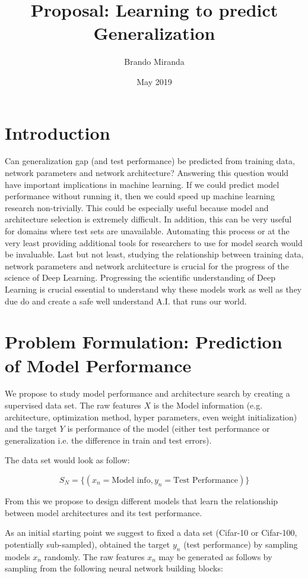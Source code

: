 \documentclass{article}
\title{Proposal: Learning to predict Generalization}
\author{Brando Miranda }
\date{May 2019}
\begin{document}
\maketitle

\section{Introduction}

Can generalization gap (and test performance) be predicted from training data, network parameters and network architecture?
Answering this question would have important implications in machine learning.
If we could predict model performance without running it, then we could speed up machine learning research non-trivially.
This could be especially useful because model and architecture selection is extremely difficult.
In addition, this can be very useful for domains where test sets are unavailable.
Automating this process or at the very least providing additional tools for researchers to use for model search would be invaluable.
Last but not least, studying the relationship between training data, network parameters and network architecture is crucial for the progress of the science of Deep Learning.
Progressing the scientific understanding of Deep Learning is crucial essential to understand why these models work as well as they due do and create a safe well understand A.I. that runs our world. 

\section{Problem Formulation: Prediction of Model Performance }

We propose to study model performance and architecture search by creating a supervised data set. 
The raw features $X$ is the Model information (e.g. architecture, optimization method, hyper parameters, even weight initialization) and the target $Y$ is performance of the model (either test performance or generalization i.e. the difference in train and test errors). 

The data set would look as follow:

$$ S_N = \{ (x_n = \text{Model info}, y_n = \text{Test Performance} ) \}$$

From this we propose to design different models that learn the relationship between model architectures and its test performance.

As an initial starting point we suggest to fixed a data set (Cifar-10 or Cifar-100, potentially sub-sampled), obtained the target $y_n$ (test performance) by sampling models $x_n$ randomly. 
The raw features $x_n$ may be generated as follows by sampling from the following neural network building blocks:
\end{document}
